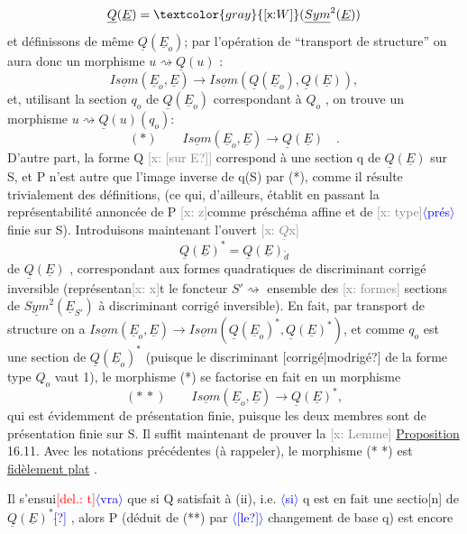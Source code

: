 \documentclass[11pt]{article}
\newcommand{\mspage}[1]{{\small\sffamily[p.\,#1]}}
\newcommand{\hand}[1]{\textcolor{blue}{#1}}
\newcommand{\inserted}[2][]{\textcolor{blue}{$\langle$#2$\rangle$}}
\newcommand{\deleted}[1]{\textcolor{red}{[\textsf{del.:} #1]}}
\newcommand{\xout}[1]{\textcolor{gray}{[\textsf{x:} #1]}}
\newcommand{\uline}[1]{\underline{#1}}
\newcommand{\unsure}[1]{[#1?]}
\begin{document}
\[ \underline{Q}(\underline{E}) =\xout{W}(\underline{Sym}^2(\underline{E})) \]
et définissons de même $\underline{Q}(\underline{E}_o)$; par l'opération de ``transport de
structure'' on aura donc un morphisme $u \rightsquigarrow \underline{Q}(u)$ :
\[ \underline{Isom}(\underline{E}_o,\underline{E}) \longrightarrow \underline{Isom}(\underline{Q}(\underline{E}_o),\underline{Q}(\underline{E})), \]
et, utilisant la section $q_o$ de $\underline{Q}(\underline{E}_o)$ correspondant à $Q_o$ , on trouve un
morphisme $u \rightsquigarrow \underline{Q}(u)(q_o)$:
\[ (*) \qquad \underline{Isom}(\underline{E}_o,\underline{E}) \longrightarrow \underline{Q}(\underline{E}) \quad . \]
D'autre part, la forme Q \xout{\unsure{sur E}} correspond à une section q de $\underline{Q}(\underline{E})$ sur S,
et P n'est autre que l'image inverse de q(S) par (*), comme il résulte
trivialement des définitions, (ce qui, d'ailleurs, établit en passant la
représentabilité annoncée de P \xout{z}comme préschéma affine et de \xout{type}\inserted{prés} finie
sur S). Introduisons maintenant l'ouvert \xout{$\underline{Q}$x}
\[ \underline{Q}(\underline{E})^* = \underline{Q}(\underline{E})_{\tilde{d}} \]
de $\underline{Q}(\underline{E})$ , correspondant aux formes quadratiques de discriminant corrigé
inversible (représentan\xout{x}t le foncteur $S' \rightsquigarrow$ ensemble des \xout{formes}
sections de $\underline{Sym}^2(\underline{E}_{S'})$ à discriminant corrigé inversible). En fait,
par transport de structure on a $\underline{Isom}(\underline{E}_o,\underline{E}) \rightarrow \underline{Isom}(\underline{Q}(\underline{E}_o)^*,\underline{Q}(\underline{E})^*)$, et
comme $q_o$ est une section de $\underline{Q}(\underline{E}_o)^*$ (puisque le discriminant \unsure{corrigé|modrigé} de
la forme type $Q_o$ vaut 1), le morphisme (*) se factorise en fait en un
morphisme
\[ (*\,*) \qquad \underline{Isom}(\underline{E}_o,\underline{E}) \rightarrow \underline{Q}(\underline{E})^* , \]
qui est évidemment de présentation finie, puisque les deux membres sont de
présentation finie sur S. Il suffit maintenant de prouver la
\xout{Lemme} \uline{Proposition} 16.11. Avec les notations précédentes (à rappeler),
le morphisme (* *) est \uline{fidèlement plat} .

Il s'ensui\deleted{t}\inserted{vra} que si Q satisfait à (ii), i.e. \inserted{si} q est en fait une sectio[n]
de $\underline{Q}(\underline{E})^*$\hand{\unsure{$\hat{}$}} , alors P (déduit de (**) par \inserted{\unsure{le}} changement de base q) est encore

\mspage{\hand{179}}
\end{document}
